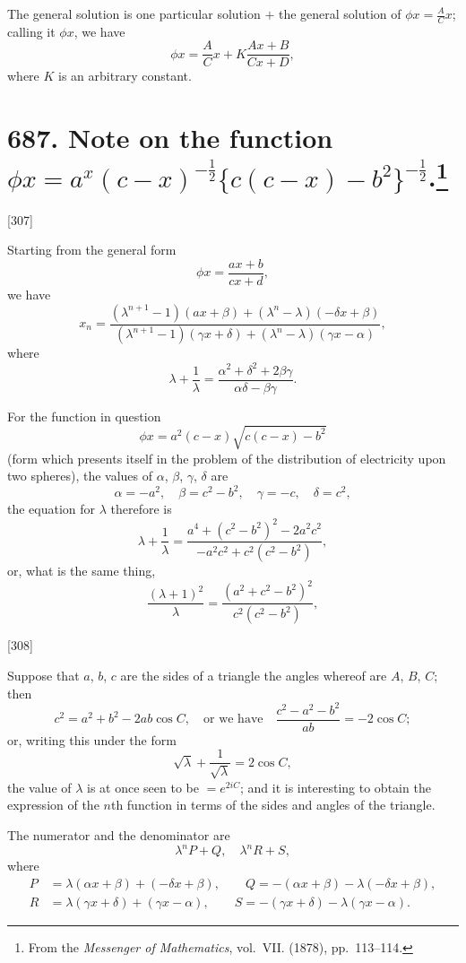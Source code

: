\documentclass[11pt,a4paper]{book}
\begin{document}
The general solution is one particular solution $+$ the general solution of $\phi x = \frac{A}{C}x$; calling it $\phi x$, we have
\[
\phi x = \frac{A}{C}x + K\frac{Ax + B}{Cx + D},
\]
where $K$ is an arbitrary constant.

\newpage
\section[Note on the function $\phi x = a^x(c-x)^{-\frac{1}{2}}\{c(c-x)-b^2\}^{-\frac{1}{2}}$]{687. Note on the function $\phi x = a^x(c-x)^{-\frac{1}{2}}\{c(c-x)-b^2\}^{-\frac{1}{2}}$.\footnote{From the \textit{Messenger of Mathematics}, vol.\ VII. (1878), pp.\ 113--114.}}

[307]

Starting from the general form
\[
\phi x = \frac{ax + b}{cx + d},
\]
we have
\[
x_n = \frac{(\lambda^{n+1} - 1)(ax + \beta) + (\lambda^n - \lambda)(-\delta x + \beta)}
{(\lambda^{n+1} - 1)(\gamma x + \delta) + (\lambda^n - \lambda)(\gamma x - \alpha)},
\]
where
\[
\lambda + \frac{1}{\lambda} = \frac{\alpha^2 + \delta^2 + 2\beta\gamma}{\alpha\delta - \beta\gamma}.
\]

For the function in question
\[
\phi x = a^2(c - x)\sqrt{c(c-x) - b^2}
\]
(form which presents itself in the problem of the distribution of electricity upon two spheres), the values of $\alpha$, $\beta$, $\gamma$, $\delta$ are
\[
\alpha = -a^2,\quad \beta = c^2 - b^2,\quad \gamma = -c,\quad \delta = c^2,
\]
the equation for $\lambda$ therefore is
\[
\lambda + \frac{1}{\lambda} = \frac{a^4 + (c^2 - b^2)^2 - 2a^2c^2}{-a^2c^2 + c^2(c^2 - b^2)},
\]
or, what is the same thing,
\[
\frac{(\lambda + 1)^2}{\lambda} = \frac{(a^2 + c^2 - b^2)^2}{c^2(c^2 - b^2)},
\]

[308]

Suppose that $a$, $b$, $c$ are the sides of a triangle the angles whereof are $A$, $B$, $C$; then
\[
c^2 = a^2 + b^2 - 2ab\cos C,\quad \text{or we have}\quad
\frac{c^2 - a^2 - b^2}{ab} = -2\cos C;
\]
or, writing this under the form
\[
\sqrt{\lambda} + \frac{1}{\sqrt{\lambda}} = 2\cos C,
\]
the value of $\lambda$ is at once seen to be $= e^{2iC}$; and it is interesting to obtain the expression of the $n$th function in terms of the sides and angles of the triangle.

The numerator and the denominator are
\[
\lambda^n P + Q,\quad \lambda^n R + S,
\]
where
\begin{align*}
P &= \lambda(\alpha x + \beta) + (-\delta x + \beta),\qquad
Q = -(\alpha x + \beta) - \lambda(-\delta x + \beta),\\
R &= \lambda(\gamma x + \delta) + (\gamma x - \alpha),\qquad
S = -(\gamma x + \delta) - \lambda(\gamma x - \alpha).
\end{align*}
\end{document}
